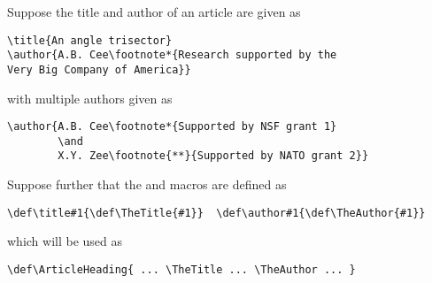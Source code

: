 Suppose the title and author of an article are given as
\begin{verbatim}
\title{An angle trisector}
\author{A.B. Cee\footnote*{Research supported by the
Very Big Company of America}}
\end{verbatim}
with multiple authors
given as
\begin{verbatim}
\author{A.B. Cee\footnote*{Supported by NSF grant 1}
        \and
        X.Y. Zee\footnote{**}{Supported by NATO grant 2}}
\end{verbatim}
Suppose further that the  and  macros
are defined as
\begin{verbatim}
\def\title#1{\def\TheTitle{#1}}  \def\author#1{\def\TheAuthor{#1}}
\end{verbatim}
which will be used as
\begin{verbatim}
\def\ArticleHeading{ ... \TheTitle ... \TheAuthor ... }
\end{verbatim}

